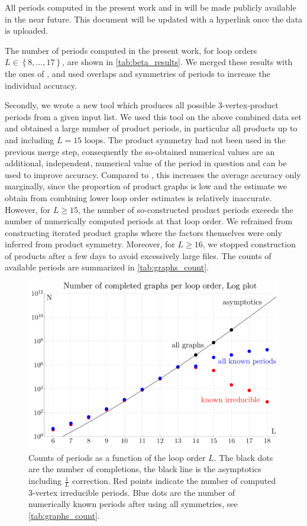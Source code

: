 \documentclass[12pt]{article}
\numberwithin{equation}{section}
\begin{document}
All periods computed in the present work and in \cite{balduf_statistics_2023} will be made publicly available in the near future. This document will be updated with a hyperlink once the data is uploaded.

The number of periods computed in the present work, for   loop orders $L\in \left \lbrace 8, \ldots, 17 \right \rbrace $, are shown in  \cref{tab:beta_results}.   
We merged these results with the ones of \cite{balduf_statistics_2023}, and used overlaps and symmetries of periods to increase the individual accuracy. 


Secondly, we wrote a new tool which produces all possible 3-vertex-product periods from a given input list. We used this tool on the above combined data set and obtained a large number of product periods, in particular all products up to and  including $L=15$ loops. The product symmetry had not been used in the previous merge step, consequently the so-obtained numerical values are an additional, independent, numerical value of the period in question and can be used to improve accuracy. Compared to \cite{balduf_statistics_2023}, this increases the average accuracy only marginally,   since the proportion of product graphs is low and the estimate we obtain from combining lower loop order estimates is relatively inaccurate. However, for $L\geq 15$, the number of so-constructed product periods exceeds the number of numerically computed periods at that loop order.  We refrained from constructing iterated product graphs where the factors themselves were only inferred from product symmetry. Moreover, for $L \geq 16$, we stopped construction of products after a few days to avoid excessively large files. The counts of available periods are summarized in \cref{tab:graphs_count}. 





\begin{figure}[htb]
	\centering
	\includegraphics[width=.6\linewidth]{figures/number_of_graphs}
	\caption{Counts of periods as a function of the loop order $L$. The black dots are the number of completions, the black line is the asymptotics \cite{borinsky_renormalized_2017} including $\frac 1 L$ correction. Red points indicate the number of computed 3-vertex irreducible periods. Blue dots are the number of numerically known periods after using all symmetries, see \cref{tab:graphs_count}.  }
	\label{fig:number_of_graphs}
\end{figure}
\end{document}
